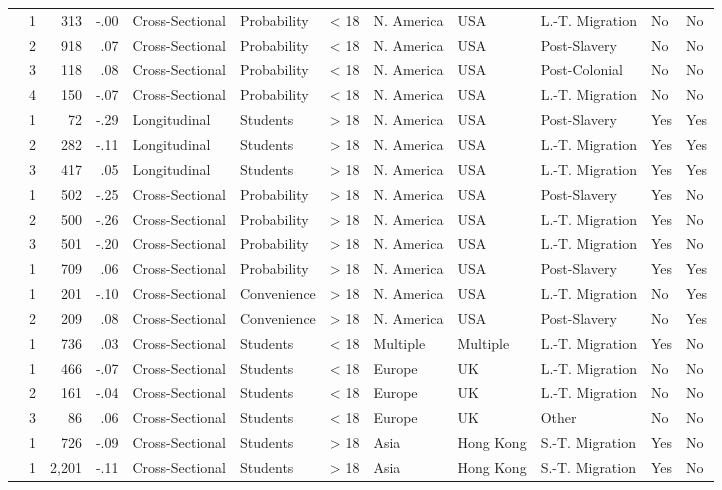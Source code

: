 \documentclass[10pt, letterpaper]{article}
\begin{document}
\begin{landscape}
\begin{xltabular}{650pt}{Xrrrllrlllll}
\cite{1221} & 1 & 313 & -.00 & Cross-Sectional & Probability & < 18 & N. America & USA & L.-T. Migration & No & No\\
 & 2 & 918 & .07 & Cross-Sectional & Probability & < 18 & N. America & USA & Post-Slavery & No & No\\
 & 3 & 118 & .08 & Cross-Sectional & Probability & < 18 & N. America & USA & Post-Colonial & No & No\\
 & 4 & 150 & -.07 & Cross-Sectional & Probability & < 18 & N. America & USA & L.-T. Migration & No & No\\
\cite{1743} & 1 & 72 & -.29 & Longitudinal & Students & > 18 & N. America & USA & Post-Slavery & Yes & Yes\\
 & 2 & 282 & -.11 & Longitudinal & Students & > 18 & N. America & USA & L.-T. Migration & Yes & Yes\\
 & 3 & 417 & .05 & Longitudinal & Students & > 18 & N. America & USA & L.-T. Migration & Yes & Yes\\
\cite{1658} & 1 & 502 & -.25 & Cross-Sectional & Probability & > 18 & N. America & USA & Post-Slavery & Yes & No\\
 & 2 & 500 & -.26 & Cross-Sectional & Probability & > 18 & N. America & USA & L.-T. Migration & Yes & No\\
 & 3 & 501 & -.20 & Cross-Sectional & Probability & > 18 & N. America & USA & L.-T. Migration & Yes & No\\
\cite{933} & 1 & 709 & .06 & Cross-Sectional & Probability & > 18 & N. America & USA & Post-Slavery & Yes & Yes\\
\cite{2394} & 1 & 201 & -.10 & Cross-Sectional & Convenience & > 18 & N. America & USA & L.-T. Migration & No & Yes\\
 & 2 & 209 & .08 & Cross-Sectional & Convenience & > 18 & N. America & USA & Post-Slavery & No & Yes\\
\cite{829} & 1 & 736 & .03 & Cross-Sectional & Students & < 18 & Multiple & Multiple & L.-T. Migration & Yes & No\\
\cite{2383} & 1 & 466 & -.07 & Cross-Sectional & Students & < 18 & Europe & UK & L.-T. Migration & No & No\\
 & 2 & 161 & -.04 & Cross-Sectional & Students & < 18 & Europe & UK & L.-T. Migration & No & No\\
 & 3 & 86 & .06 & Cross-Sectional & Students & < 18 & Europe & UK & Other & No & No\\
\cite{1395} & 1 & 726 & -.09 & Cross-Sectional & Students & > 18 & Asia & Hong Kong & S.-T. Migration & Yes & No\\
\cite{3000} & 1 & 2,201 & -.11 & Cross-Sectional & Students & > 18 & Asia & Hong Kong & S.-T. Migration & Yes & No\\
\end{xltabular}


\end{landscape}
\end{document}
